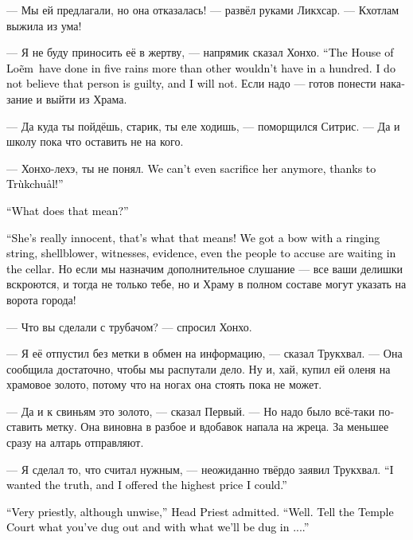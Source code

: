 \documentclass[a4paper,12pt,fleqn]{book}\usepackage{cooltooltips}\usepackage{polyglossia}\setdefaultlanguage[babelshorthands=true]{russian}\setotherlanguage{english}\defaultfontfeatures{Ligatures=TeX,Mapping=tex-text} \usepackage{xcolor}\definecolor{lightgray}{HTML}{bbbbbb}\color{lightgray}\newcommand{\ml}[3]{\textenglish{\textcolor{black}{#3}} }
\newcommand{\Loem}{Lo\~{e}m}
\newcommand{\Trukchual}{Tr\`{u}kchu\r{a}l}
\begin{document}
--- Мы ей предлагали, но она отказалась! --- развёл руками Ликхсар.
--- Кхотлам выжила из ума!

--- Я не буду приносить её в жертву, --- напрямик сказал Хонхо.
\ml{$0$}
{--- Двор Люм за пять дождей сделал то, чего не удавалось другим за сотню.}
{``The House of \Loem\ have done in five rains more than other wouldn't have in a hundred.}
\ml{$0$}
{Я не верю в виновность этого человека, и не поверю.}
{I do not believe that person is guilty, and I will not.}
Если надо --- готов понести наказание и выйти из Храма.

--- Да куда ты пойдёшь, старик, ты еле ходишь, --- поморщился Ситрис.
--- Да и школу пока что оставить не на кого.

--- Хонхо-лехэ, ты не понял.
\ml{$0$}
{Мы её и в жертву теперь принести не можем --- благодаря Трукхвалу!}
{We can't even sacrifice her anymore, thanks to \Trukchual!''}

\ml{$0$}
{--- Что это значит?}
{``What does that mean?''}

\ml{$0$}
{--- Она действительно невиновна --- вот что это значит!}
{``She's really innocent, that's what that means!}
\ml{$0$}
{Есть лук со звенящей тетивой, трубач, свидетели, улики, даже обвиняемые уже ждут в подвале.}
{We got a bow with a ringing string, shellblower, witnesses, evidence, even the people to accuse are waiting in the cellar.}
Но если мы назначим дополнительное слушание --- все ваши делишки вскроются, и тогда не только тебе, но и Храму в полном составе могут указать на ворота города!

--- Что вы сделали с трубачом? --- спросил Хонхо.

--- Я её отпустил без метки в обмен на информацию, --- сказал Трукхвал.
--- Она сообщила достаточно, чтобы мы распутали дело.
Ну и, хай, купил ей оленя на храмовое золото, потому что на ногах она стоять пока не может.

--- Да и к свиньям это золото, --- сказал Первый.
--- Но надо было всё-таки поставить метку.
Она виновна в разбое и вдобавок напала на жреца.
За меньшее сразу на алтарь отправляют.

--- Я сделал то, что считал нужным, --- неожиданно твёрдо заявил Трукхвал.
\ml{$0$}
{--- Мне нужна была истина, и я предложил за неё самую высокую цену, какую мог предложить.}
{``I wanted the truth, and I offered the highest price I could.''}

\ml{$0$}
{--- Очень по-жречески, хоть и недальновидно, --- признал Первый.}
{``Very priestly, although unwise,'' Head Priest admitted.}
\ml{$0$}
{--- Ладно.}
{``Well.}
\ml{$0$}
{Выкладывай Совету Храма, что накопал и чем нас закопают...}
{Tell the Temple Court what you've dug out and with what we'll be dug in ....''}
\end{document}
